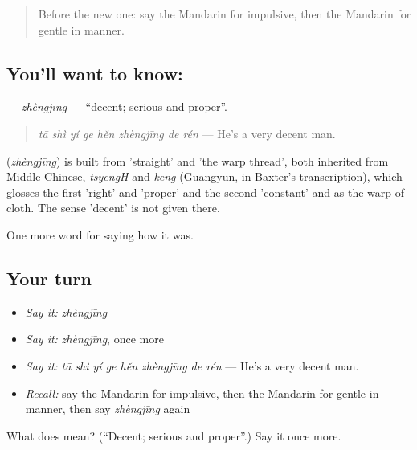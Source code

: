 \label{lesson:ZH-C469-zhengjing}



\begin{quote}
Before the new one: say the Mandarin for impulsive, then the Mandarin for gentle in manner.
\end{quote}

\subsection*{You'll want to know: }
\textbf{} — \emph{zhèngjīng} — \textquotedblleft{}decent; serious and proper\textquotedblright{}.

\begin{quote}
\textbf{} \emph{tā shì yí ge hěn zhèngjīng de rén} — He's a very decent man.
\end{quote}

\begin{cousinweb}
\textbf{} (\emph{zhèngjīng}) is built from  'straight' and  'the warp thread', both inherited from Middle Chinese, \emph{tsyengH} and \emph{keng} (Guangyun, in Baxter's transcription), which glosses the first 'right' and 'proper' and the second 'constant' and as the warp of cloth. The sense 'decent' is not given there.
\end{cousinweb}

\begin{grammarlens}[title={What you've built}]
One more word for saying how it was.
\end{grammarlens}

\subsection*{Your turn}
\begin{itemize}
\raggedright
  \item \emph{Say it:} \emph{zhèngjīng}
  \item \emph{Say it:} \emph{zhèngjīng}, once more
  \item \emph{Say it:} \emph{tā shì yí ge hěn zhèngjīng de rén} — He's a very decent man.
  \item \emph{Recall:} say the Mandarin for impulsive, then the Mandarin for gentle in manner, then say \emph{zhèngjīng} again
\end{itemize}

\begin{tcolorbox}[breakable,colback=teal!4,colframe=teal!35!black,title={Before you move on}]
What does  mean? (\textquotedblleft{}Decent; serious and proper\textquotedblright{}.) Say it once more.
\end{tcolorbox}
